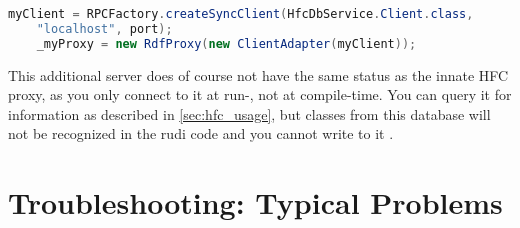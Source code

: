 \begin{center}
  \begin{lstlisting}[language=Java]
    myClient = RPCFactory.createSyncClient(HfcDbService.Client.class,
    "localhost", port);
    _myProxy = new RdfProxy(new ClientAdapter(myClient));
  \end{lstlisting}
\end{center}

This additional server does of course not have the same status as the innate HFC proxy, as you only connect to it at run-, not at compile-time. You can query it for information as described in \ref{sec:hfc_usage}, but classes from this database will not be recognized in the rudi code and you cannot write to it .
\fi

\section{Troubleshooting: Typical Problems}

